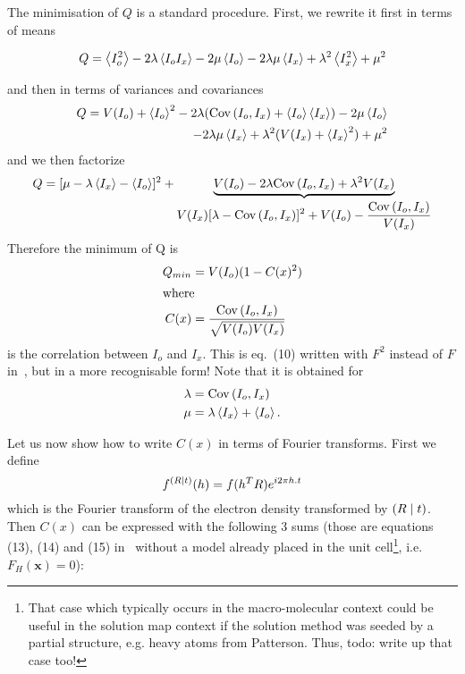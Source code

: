 \documentclass[11pt]{article}
\begin{document}
The minimisation of $Q$ is a standard procedure. First, we rewrite it first in terms of means

\begin{equation*}
Q = \left\langle I_o^2 \right\rangle -2\lambda\left\langle I_o I_x \right\rangle -2\mu\left\langle I_o \right\rangle -2\lambda\mu\left\langle I_x \right\rangle + \lambda^2\left\langle I_x^2 \right\rangle + \mu^2
\end{equation*}

and then in terms of variances and covariances
\begin{equation*}
\begin{split}
Q = V(I_o) + \left\langle I_o \right\rangle^2 -2\lambda(\mathrm{Cov}\left(I_o,I_x\right) + \left\langle I_o \right\rangle\left\langle I_x \right\rangle) -2\mu\left\langle I_o \right\rangle
\\
-2\lambda\mu \left\langle I_x \right\rangle + \lambda^2(V(I_x) + \left\langle I_x \right\rangle^2) + \mu^2
\end{split}
\end{equation*}
and we then factorize
\begin{equation*}
Q = [\mu - \lambda \left\langle I_x \right\rangle - \left\langle I_o \right\rangle]^2 + \underbrace{V(I_o) - 2\lambda\mathrm{Cov}\left(I_o,I_x\right) + \lambda^2V(I_x)}_{\displaystyle V(I_x)[\lambda - \mathrm{Cov}\left(I_o,I_x\right)]^2 + V(I_o) - \frac{\mathrm{Cov}\left(I_o,I_x\right)}{V(I_x)}}
\end{equation*}
Therefore the minimum of Q is
\begin{align}
Q_{min} &= V(I_o)(1-C(x)^2)\\
\intertext{where}
C(x) &= \frac{\mathrm{Cov}\left(I_o,I_x\right)}{\sqrt{V(I_o)V(I_x)}}
\end{align}
is the correlation between $I_o$ and $I_x$. This is eq.~(10) written with $F^2$ instead of $F$ in~\cite{J.Navaza:1995}, but in a more recognisable form! Note that it is obtained for
\begin{align}
\lambda &= \mathrm{Cov}\left(I_o,I_x\right)\\
\mu &= \lambda\left\langle I_x \right\rangle + \left\langle I_o \right\rangle. 
\end{align}

Let us now show how to write $C(x)$ in terms of Fourier transforms. First we define
\begin{equation}
f^{\left( R \mid t \right)}(h) = f(h^T R) e^{i2\pi h.t}
\end{equation}
which is the Fourier transform of the electron density transformed by $\left( R \mid t \right)$.
Then $C(x)$ can be expressed with the following 3 sums (those are equations (13), (14) and (15) in~\cite{J.Navaza:1995} without a model already placed in the unit cell\footnote{That case which typically occurs in the macro-molecular context could be useful in the solution map context if the solution method was seeded by a partial structure, e.g. heavy atoms from Patterson. Thus, todo: write up that case too!}, i.e. $F_H(\mathbf{x}) = 0$):
\end{document}
